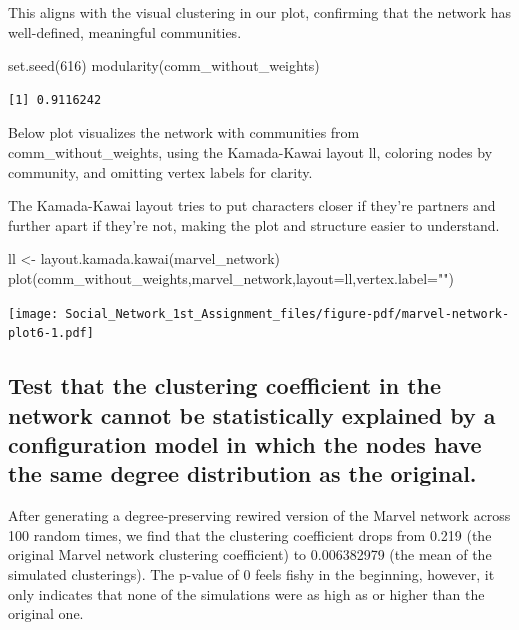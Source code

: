 \documentclass[
  letterpaper,
  DIV=11,
  numbers=noendperiod]{scrartcl}
\newenvironment{Shaded}{\begin{snugshade}}{\end{snugshade}}
\newcommand{\AttributeTok}[1]{\textcolor[rgb]{0.40,0.45,0.13}{#1}}
\newcommand{\DecValTok}[1]{\textcolor[rgb]{0.68,0.00,0.00}{#1}}
\newcommand{\FunctionTok}[1]{\textcolor[rgb]{0.28,0.35,0.67}{#1}}
\newcommand{\NormalTok}[1]{\textcolor[rgb]{0.00,0.23,0.31}{#1}}
\newcommand{\OtherTok}[1]{\textcolor[rgb]{0.00,0.23,0.31}{#1}}
\newcommand{\StringTok}[1]{\textcolor[rgb]{0.13,0.47,0.30}{#1}}
\begin{document}
This aligns with the visual clustering in our plot, confirming that the
network has well-defined, meaningful communities.

\begin{Shaded}
\begin{Highlighting}[]
\FunctionTok{set.seed}\NormalTok{(}\DecValTok{616}\NormalTok{)}
\FunctionTok{modularity}\NormalTok{(comm\_without\_weights)}
\end{Highlighting}
\end{Shaded}

\begin{verbatim}
[1] 0.9116242
\end{verbatim}

Below plot visualizes the network with communities from
comm\_without\_weights, using the Kamada-Kawai layout ll, coloring nodes
by community, and omitting vertex labels for clarity.

The Kamada-Kawai layout tries to put characters closer if they're
partners and further apart if they're not, making the plot and structure
easier to understand.

\begin{Shaded}
\begin{Highlighting}[]
\NormalTok{ll }\OtherTok{\textless{}{-}} \FunctionTok{layout.kamada.kawai}\NormalTok{(marvel\_network)}
\FunctionTok{plot}\NormalTok{(comm\_without\_weights,marvel\_network,}\AttributeTok{layout=}\NormalTok{ll,}\AttributeTok{vertex.label=}\StringTok{""}\NormalTok{)}
\end{Highlighting}
\end{Shaded}

\texttt{[image: Social\_Network\_1st\_Assignment\_files/figure-pdf/marvel-network-plot6-1.pdf]}

\subsection{Test that the clustering coefficient in the network cannot
be statistically explained by a configuration model in which the nodes
have the same degree distribution as the
original.}\label{test-that-the-clustering-coefficient-in-the-network-cannot-be-statistically-explained-by-a-configuration-model-in-which-the-nodes-have-the-same-degree-distribution-as-the-original.}

After generating a degree-preserving rewired version of the Marvel
network across 100 random times, we find that the clustering coefficient
drops from 0.219 (the original Marvel network clustering coefficient) to
0.006382979 (the mean of the simulated clusterings). The p-value of 0
feels fishy in the beginning, however, it only indicates that none of
the simulations were as high as or higher than the original one.
\end{document}
